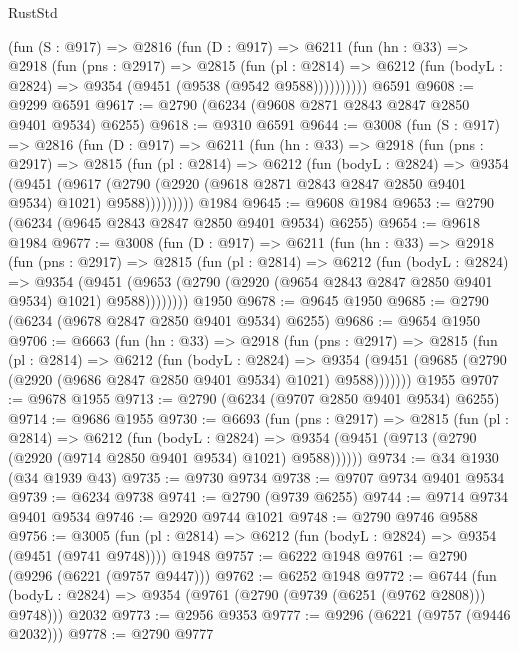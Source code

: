\begin{lexlean}{RustStd}
\begin{coremodule}
{\begin{coremodule}
{{{{{{{{{{{{{{{{{{{{{{{{{{      (fun (S : @917) =>
      @2816
        (fun (D : @917) =>
        @6211
          (fun (hn : @33) =>
          @2918
            (fun (pns : @2917) =>
            @2815
              (fun (pl : @2814) =>
              @6212 (fun (bodyL : @2824) => @9354 (@9451 (@9538 (@9542 @9588))))))))))
    @6591
@9608 := @9299 @6591
@9617 := @2790 (@6234 (@9608 @2871 @2843 @2847 @2850 @9401 @9534) @6255)
@9618 := @9310 @6591
@9644 := @3008
    (fun (S : @917) =>
    @2816
      (fun (D : @917) =>
      @6211
        (fun (hn : @33) =>
        @2918
          (fun (pns : @2917) =>
          @2815
            (fun (pl : @2814) =>
            @6212
              (fun (bodyL : @2824) =>
              @9354
                (@9451
                  (@9617
                    (@2790 (@2920 (@9618 @2871 @2843 @2847 @2850 @9401 @9534) @1021) @9588)))))))))
    @1984
@9645 := @9608 @1984
@9653 := @2790 (@6234 (@9645 @2843 @2847 @2850 @9401 @9534) @6255)
@9654 := @9618 @1984
@9677 := @3008
    (fun (D : @917) =>
    @6211
      (fun (hn : @33) =>
      @2918
        (fun (pns : @2917) =>
        @2815
          (fun (pl : @2814) =>
          @6212
            (fun (bodyL : @2824) =>
            @9354
              (@9451 (@9653 (@2790 (@2920 (@9654 @2843 @2847 @2850 @9401 @9534) @1021) @9588))))))))
    @1950
@9678 := @9645 @1950
@9685 := @2790 (@6234 (@9678 @2847 @2850 @9401 @9534) @6255)
@9686 := @9654 @1950
@9706 := @6663
    (fun (hn : @33) =>
    @2918
      (fun (pns : @2917) =>
      @2815
        (fun (pl : @2814) =>
        @6212
          (fun (bodyL : @2824) =>
          @9354 (@9451 (@9685 (@2790 (@2920 (@9686 @2847 @2850 @9401 @9534) @1021) @9588)))))))
    @1955
@9707 := @9678 @1955
@9713 := @2790 (@6234 (@9707 @2850 @9401 @9534) @6255)
@9714 := @9686 @1955
@9730 := @6693
    (fun (pns : @2917) =>
    @2815
      (fun (pl : @2814) =>
      @6212
        (fun (bodyL : @2824) =>
        @9354 (@9451 (@9713 (@2790 (@2920 (@9714 @2850 @9401 @9534) @1021) @9588))))))
@9734 := @34 @1930 (@34 @1939 @43)
@9735 := @9730 @9734
@9738 := @9707 @9734 @9401 @9534
@9739 := @6234 @9738
@9741 := @2790 (@9739 @6255)
@9744 := @9714 @9734 @9401 @9534
@9746 := @2920 @9744 @1021
@9748 := @2790 @9746 @9588
@9756 := @3005
    (fun (pl : @2814) => @6212 (fun (bodyL : @2824) => @9354 (@9451 (@9741 @9748))))
    @1948
@9757 := @6222 @1948
@9761 := @2790 (@9296 (@6221 (@9757 @9447)))
@9762 := @6252 @1948
@9772 := @6744
    (fun (bodyL : @2824) => @9354 (@9761 (@2790 (@9739 (@6251 (@9762 @2808))) @9748)))
    @2032
@9773 := @2956 @9353
@9777 := @9296 (@6221 (@9757 (@9446 @2032)))
@9778 := @2790 @9777
}}}}}}}}}}}}}}}}}}}}}}}}}}
\end{coremodule}}
\end{coremodule}
\end{lexlean}
